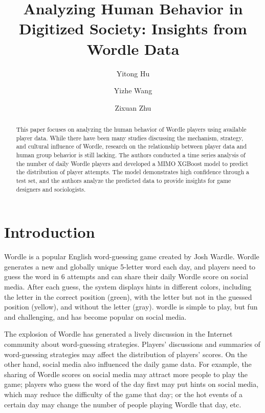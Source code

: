 \documentclass[a4paper]{jpconf}
\begin{document}
\title{Analyzing Human Behavior in Digitized Society: Insights from Wordle Data}

\author{Yitong Hu}

\address{Beijing University of Posts and Telecommunications, Beijing, China}


\author{Yizhe Wang}

\address{Beijing University of Posts and Telecommunications, Beijing, China}


\author{Zixuan Zhu}

\address{Beijing University of Posts and Telecommunications, Beijing, China}


\begin{abstract}
This paper focuses on analyzing the human behavior of Wordle players using available player data. While there have been many studies discussing the mechanism, strategy, and cultural influence of Wordle, research on the relationship between player data and human group behavior is still lacking. The authors conducted a time series analysis of the number of daily Wordle players and developed a MIMO XGBoost model to predict the distribution of player attempts. The model demonstrates high confidence through a test set, and the authors analyze the predicted data to provide insights for game designers and sociologists.
\end{abstract}

\section{Introduction}
Wordle is a popular English word-guessing game created by Josh Wardle. Wordle generates a new and globally unique 5-letter word each day, and players need to guess the word in 6 attempts and can share their daily Wordle score on social media. After each guess, the system displays hints in different colors, including the letter in the correct position (green), with the letter but not in the guessed position (yellow), and without the letter (gray). wordle is simple to play, but fun and challenging, and has become popular on social media.

The explosion of Wordle has generated a lively discussion in the Internet community about word-guessing strategies. Players' discussions and summaries of word-guessing strategies may affect the distribution of players' scores. On the other hand, social media also influenced the daily game data. For example, the sharing of Wordle scores on social media may attract more people to play the game; players who guess the word of the day first may put hints on social media, which may reduce the difficulty of the game that day; or the hot events of a certain day may change the number of people playing Wordle that day, etc.
\end{document}
